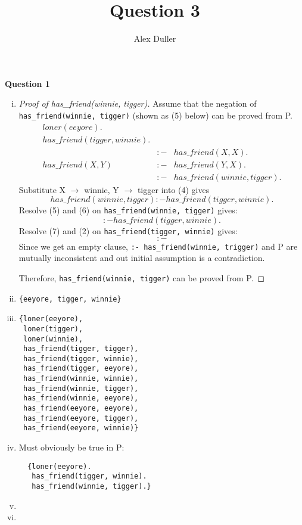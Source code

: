 \documentclass[a4paper,11pt]{article}
\author{Alex Duller}
\title{Question 3}
\begin{document}
\textbf{Question 1}
\begin{enumerate}[(i)]
\item
\begin{proof}[Proof of has\_friend(winnie, tigger)]
  Assume that the negation of \verb#has_friend(winnie, tigger)# (shown as (5)
  below) can be proved from P.\\
\begin{eqnarray}
  loner(eeyore). &&\\
  has\_friend(tigger, winnie). &&\\
  &:-& has\_friend(X, X).\\
  has\_friend(X, Y) &:-& has\_friend(Y, X).\\
  &:-& has\_friend(winnie, tigger).
\end{eqnarray}
Substitute {X \ensuremath{\to} winnie, Y \ensuremath{\to} tigger} into (4) gives
\begin{equation}
  has\_friend(winnie, tigger) :- has\_friend(tigger, winnie).
\end{equation}
Resolve (5) and (6) on \verb#has_friend(winnie, tigger)# gives:
\begin{equation}
  :- has\_friend(tigger, winnie).
\end{equation}
Resolve (7) and (2) on \verb#has_friend(tigger, winnie)# gives:
\begin{equation}
  :-
\end{equation}
Since we get an empty clause, \verb#:- has_friend(winnie, trigger)# and P are
mutually inconsistent and out initial assumption is a contradiction.

Therefore, \verb#has_friend(winnie, tigger)# can be proved from P.
\end{proof}

\item \verb#{eeyore, tigger, winnie}#

\item
\begin{lstlisting}
{loner(eeyore), 
 loner(tigger), 
 loner(winnie),
 has_friend(tigger, tigger), 
 has_friend(tigger, winnie), 
 has_friend(tigger, eeyore),
 has_friend(winnie, winnie), 
 has_friend(winnie, tigger), 
 has_friend(winnie, eeyore),
 has_friend(eeyore, eeyore), 
 has_friend(eeyore, tigger), 
 has_friend(eeyore, winnie)}
\end{lstlisting}

\item Must obviously be true in P:
\begin{lstlisting}
  {loner(eeyore).
   has_friend(tigger, winnie).
   has_friend(winnie, tigger).}
\end{lstlisting}


\item

\item

\end{enumerate}
\end{document}
